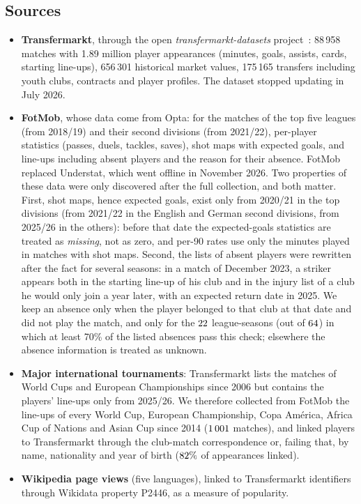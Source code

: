 \documentclass[11pt]{amsart}
\theoremstyle{definition}
\theoremstyle{remark}
\begin{document}
\subsection{Sources}
\begin{itemize}
\item \textbf{Transfermarkt}, through the open \emph{transfermarkt-datasets} project~\cite{tmdata}: 88\,958 matches with 1.89 million player appearances (minutes, goals, assists, cards, starting line-ups), 656\,301 historical market values, 175\,165 transfers including youth clubs, contracts and player profiles. The dataset stopped updating in July 2026.
\item \textbf{FotMob}, whose data come from Opta: for the matches of the top five leagues (from 2018/19) and their second divisions (from 2021/22), per-player statistics (passes, duels, tackles, saves), shot maps with expected goals, and line-ups including absent players and the reason for their absence. FotMob replaced Understat, which went offline in November 2026. Two properties of these data were only discovered after the full collection, and both matter. First, shot maps, hence expected goals, exist only from 2020/21 in the top divisions (from 2021/22 in the English and German second divisions, from 2025/26 in the others): before that date the expected-goals statistics are treated as \emph{missing}, not as zero, and per-90 rates use only the minutes played in matches with shot maps. Second, the lists of absent players were rewritten after the fact for several seasons: in a match of December 2023, a striker appears both in the starting line-up of his club and in the injury list of a club he would only join a year later, with an expected return date in 2025. We keep an absence only when the player belonged to that club at that date and did not play the match, and only for the $22$ league-seasons (out of $64$) in which at least 70\% of the listed absences pass this check; elsewhere the absence information is treated as unknown.
\item \textbf{Major international tournaments}: Transfermarkt lists the matches of World Cups and European Championships since 2006 but contains the players' line-ups only from 2025/26. We therefore collected from FotMob the line-ups of every World Cup, European Championship, Copa Am\'erica, Africa Cup of Nations and Asian Cup since 2014 ($1\,001$ matches), and linked players to Transfermarkt through the club-match correspondence or, failing that, by name, nationality and year of birth ($82\%$ of appearances linked).
\item \textbf{Wikipedia page views} (five languages), linked to Transfermarkt identifiers through Wikidata property P2446, as a measure of popularity.
\end{itemize}
\end{document}
